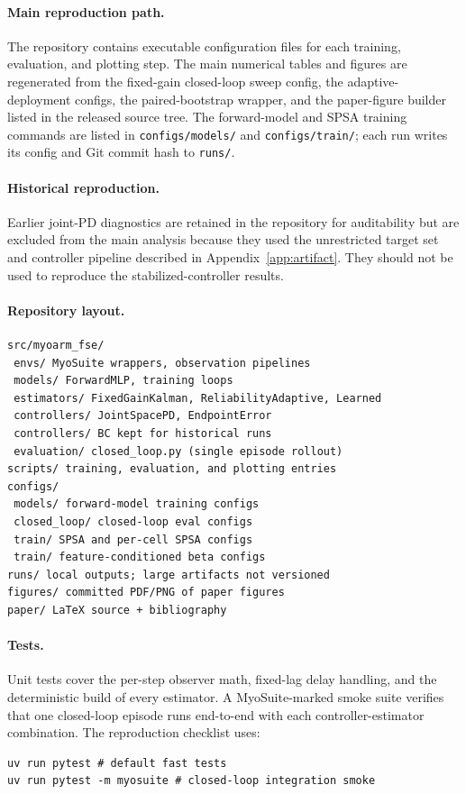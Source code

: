 \documentclass[sn-mathphys,NameDate,iicol]{sn-jnl}
\begin{document}
\begin{appendices}
\paragraph{Main reproduction path.}
The repository contains executable configuration files for each training,
evaluation, and plotting step. The main numerical tables and figures are
regenerated from the
fixed-gain closed-loop sweep config, the adaptive-deployment configs, the
paired-bootstrap wrapper, and the paper-figure builder listed in the released
source tree. The forward-model and SPSA training commands are listed in
\texttt{configs/models/} and \texttt{configs/train/}; each run writes
its config and Git commit hash to \texttt{runs/}.

\paragraph{Historical reproduction.}
Earlier joint-PD diagnostics are retained in the repository for auditability but
are excluded from the main analysis because they used the unrestricted target
set and controller pipeline described in Appendix~\ref{app:artifact}. They
should not be used to reproduce the stabilized-controller results.

\paragraph{Repository layout.}
\begin{footnotesize}
\begin{verbatim}
src/myoarm_fse/
 envs/ MyoSuite wrappers, observation pipelines
 models/ ForwardMLP, training loops
 estimators/ FixedGainKalman, ReliabilityAdaptive, Learned
 controllers/ JointSpacePD, EndpointError
 controllers/ BC kept for historical runs
 evaluation/ closed_loop.py (single episode rollout)
scripts/ training, evaluation, and plotting entries
configs/
 models/ forward-model training configs
 closed_loop/ closed-loop eval configs
 train/ SPSA and per-cell SPSA configs
 train/ feature-conditioned beta configs
runs/ local outputs; large artifacts not versioned
figures/ committed PDF/PNG of paper figures
paper/ LaTeX source + bibliography
\end{verbatim}
\end{footnotesize}

\paragraph{Tests.}
Unit tests cover the per-step observer math, fixed-lag delay
handling, and the deterministic build of every estimator. A
MyoSuite-marked smoke suite verifies that one closed-loop episode
runs end-to-end with each controller-estimator combination. The
reproduction checklist uses:
\begin{footnotesize}
\begin{verbatim}
uv run pytest # default fast tests
uv run pytest -m myosuite # closed-loop integration smoke
\end{verbatim}
\end{footnotesize}


\end{appendices}
\end{document}
